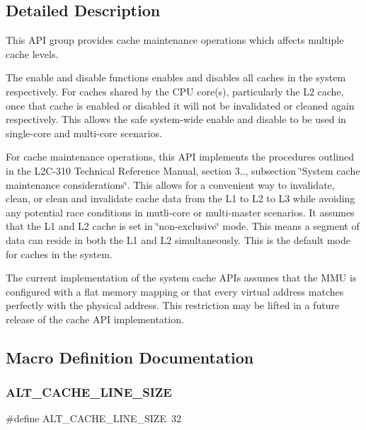 \subsection{Detailed Description}
This A\+PI group provides cache maintenance operations which affects multiple cache levels.

The enable and disable functions enables and disables all caches in the system respectively. For caches shared by the C\+PU core(s), particularly the L2 cache, once that cache is enabled or disabled it will not be invalidated or cleaned again respectively. This allows the safe system-\/wide enable and disable to be used in single-\/core and multi-\/core scenarios.

For cache maintenance operations, this A\+PI implements the procedures outlined in the L2\+C-\/310 Technical Reference Manual, section 3.., subsection \char`\"{}\+System cache maintenance considerations\char`\"{}. This allows for a convenient way to invalidate, clean, or clean and invalidate cache data from the L1 to L2 to L3 while avoiding any potential race conditions in mutli-\/core or multi-\/master scenarios. It assumes that the L1 and L2 cache is set in \char`\"{}non-\/exclusive\char`\"{} mode. This means a segment of data can reside in both the L1 and L2 simultaneously. This is the default mode for caches in the system.

The current implementation of the system cache A\+P\+Is assumes that the M\+MU is configured with a flat memory mapping or that every virtual address matches perfectly with the physical address. This restriction may be lifted in a future release of the cache A\+PI implementation. 

\subsection{Macro Definition Documentation}
\mbox{\label{group__CACHE__SYS_ga86dd25e6cd718fa78826b612132df84e}} 
\subsubsection{\texorpdfstring{ALT\_CACHE\_LINE\_SIZE}{ALT\_CACHE\_LINE\_SIZE}}
{\footnotesize\ttfamily \#define A\+L\+T\+\_\+\+C\+A\+C\+H\+E\+\_\+\+L\+I\+N\+E\+\_\+\+S\+I\+ZE~32}

